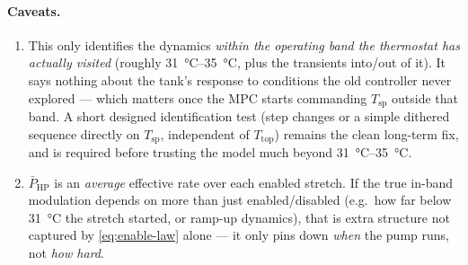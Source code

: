 \documentclass[11pt,a4paper]{article}
\newcommand{\Ttop}{T_{\mathrm{top}}}
\newcommand{\Tsp}{T_{\mathrm{sp}}} %
\begin{document}
\paragraph{Caveats.}
\begin{enumerate}[nosep]
  \item This only identifies the dynamics \emph{within the operating band the
        thermostat has actually visited} (roughly \SIrange{31}{35}{\celsius},
        plus the transients into/out of it). It says nothing about the tank's
        response to conditions the old controller never explored --- which
        matters once the MPC starts commanding $\Tsp$ outside that band. A
        short designed identification test (step changes or a simple dithered
        sequence directly on $\Tsp$, independent of $\Ttop$) remains the clean
        long-term fix, and is required before trusting the model much beyond
        \SIrange{31}{35}{\celsius}.
  \item $\bar P_{\mathrm{HP}}$ is an \emph{average} effective rate over each
        enabled stretch. If the true in-band modulation depends on more than
        just enabled/disabled (e.g.\ how far below \SI{31}{\celsius} the
        stretch started, or ramp-up dynamics), that is extra structure not
        captured by \eqref{eq:enable-law} alone --- it only pins down
        \emph{when} the pump runs, not \emph{how hard}.
\end{enumerate}
\end{document}
